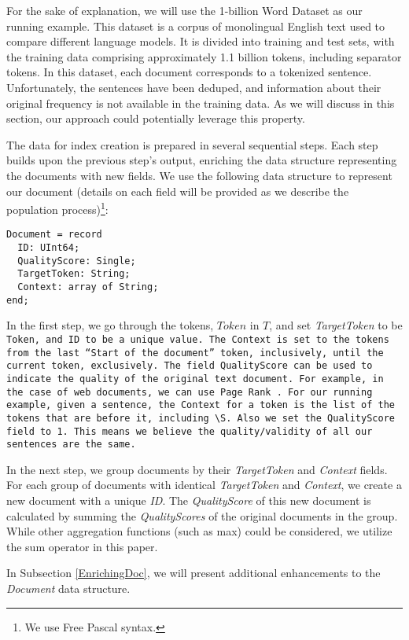   For the sake of explanation, we will use the 1-billion Word Dataset \citep{chelba2013one} as our running example. This dataset is a corpus of monolingual English text used to compare different language models. It is divided into training and test sets, with the training data comprising approximately 1.1 billion tokens, including separator tokens. In this dataset, each document corresponds to a tokenized sentence. Unfortunately, the sentences have been deduped, and information about their original frequency is not available in the training data. As we will discuss in this section, our approach could potentially leverage this property.

  The data for index creation is prepared in several sequential steps. Each step builds upon the previous step's output, enriching the data structure representing the documents with new fields. We use the following data structure to represent our document (details on each field will be provided as we describe the population process)\footnote{We use Free Pascal syntax.}:

\begin{verbatim}
Document = record
  ID: UInt64;
  QualityScore: Single;
  TargetToken: String;
  Context: array of String;
end;
\end{verbatim}

In the first step, we go through the tokens, $Token$ in $T$, and set  \textit{TargetToken} to be \tt{Token}, and \tt{ID} to be a unique value. The \tt{Context} is set to the tokens from the last “Start of the document” token, inclusively, until the current token, exclusively. The field \tt{QualityScore} can be used to indicate the quality of the original text document. For example, in the case of web documents, we can use Page Rank~\citep{brin1998anatomy}. For our running example, given a sentence,  the \tt{Context} for a \tt{token} is the list of the tokens that are before it, including \tt{\textbackslash S}. Also we set the \tt{QualityScore} field to 1. This means we believe the quality/validity of all our sentences are the same. 

In the next step, we group documents by their \textit{TargetToken} and \textit{Context} fields. For each group of documents with identical \textit{TargetToken} and \textit{Context}, we create a new document with a unique \textit{ID}. The \textit{QualityScore} of this new document is calculated by summing the \textit{QualityScores} of the original documents in the group. While other aggregation functions (such as max) could be considered, we utilize the sum operator in this paper.

In Subsection \ref{EnrichingDoc}, we will present additional enhancements to the \textit{Document} data structure.


